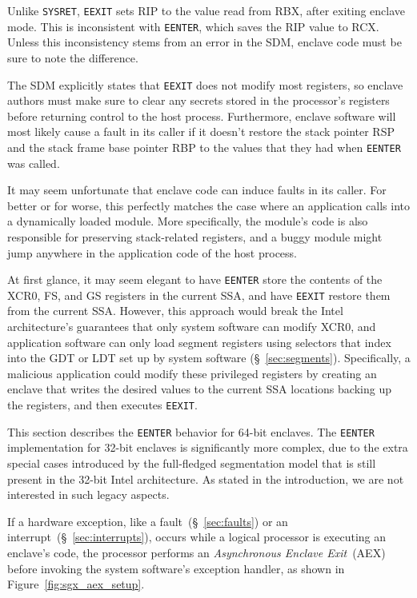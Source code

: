 Unlike \texttt{SYSRET}, \texttt{EEXIT} sets RIP to the value read from RBX,
after exiting enclave mode. This is inconsistent with \texttt{EENTER}, which
saves the RIP value to RCX. Unless this inconsistency stems from an error in
the SDM, enclave code must be sure to note the difference.

The SDM explicitly states that \texttt{EEXIT} does not modify most registers,
so enclave authors must make sure to clear any secrets stored in the
processor's registers before returning control to the host process.
Furthermore, enclave software will most likely cause a fault in its caller if
it doesn't restore the stack pointer RSP and the stack frame base pointer RBP
to the values that they had when \texttt{EENTER} was called.

It may seem unfortunate that enclave code can induce faults in its caller.
For better or for worse, this perfectly matches the case where an application
calls into a dynamically loaded module. More specifically, the module's code is
also responsible for preserving stack-related registers, and a buggy module
might jump anywhere in the application code of the host process.

At first glance, it may seem elegant to have \texttt{EENTER} store the contents
of the XCR0, FS, and GS registers in the current SSA, and have \texttt{EEXIT}
restore them from the current SSA. However, this approach would break the Intel
architecture's guarantees that only system software can modify XCR0, and
application software can only load segment registers using selectors that index
into the GDT or LDT set up by system software (\S~\ref{sec:segments}).
Specifically, a malicious application could modify these privileged registers
by creating an enclave that writes the desired values to the current SSA
locations backing up the registers, and then executes \texttt{EEXIT}.

This section describes the \texttt{EENTER} behavior for 64-bit enclaves. The
\texttt{EENTER} implementation for 32-bit enclaves is significantly more
complex, due to the extra special cases introduced by the full-fledged
segmentation model that is still present in the 32-bit Intel architecture. As
stated in the introduction, we are not interested in such legacy aspects.


\label{sec:sgx_aex}

If a hardware exception, like a fault~(\S~\ref{sec:faults}) or an
interrupt~(\S~\ref{sec:interrupts}), occurs while a logical processor is
executing an enclave's code, the processor performs an
\textit{Asynchronous Enclave Exit}~(AEX) before invoking the system software's
exception handler, as shown in Figure~\ref{fig:sgx_aex_setup}.

